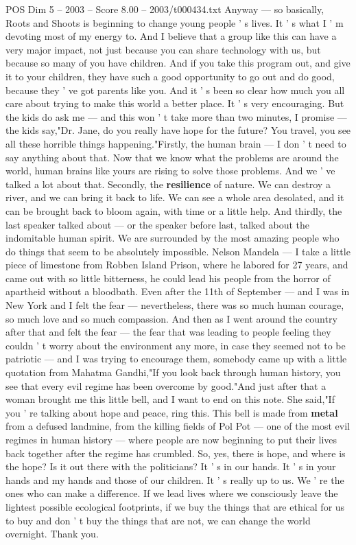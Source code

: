 \begin{textsample}{POS Dim 5 – 2003 – Score 8.00 – 2003/t000434.txt}
Anyway — so basically, Roots and Shoots is beginning to change young people ' s lives.
It ' s what I ' m devoting most of my energy to.
And I believe that a group like this can have a very major impact, not just because you can share technology with us, but because so many of you have children.
And if you take this program out, and give it to your children, they have such a good opportunity to go out and do good, because they ' ve got parents like you.
And it ' s been so clear how much you all care about trying to make this world a better place.
It ' s very encouraging.
But the kids do ask me — and this won ' t take more than two minutes, I promise — the kids say,"Dr.
Jane, do you really have hope for the future?
You travel, you see all these horrible things happening."Firstly, the human brain — I don ' t need to say anything about that.
Now that we know what the problems are around the world, human brains like yours are rising to solve those problems.
And we ' ve talked a lot about that.
Secondly, the \textbf{resilience} of nature.
We can destroy a river, and we can bring it back to life.
We can see a whole area desolated, and it can be brought back to bloom again, with time or a little help.
And thirdly, the last speaker talked about — or the speaker before last, talked about the indomitable human spirit.
We are surrounded by the most amazing people who do things that seem to be absolutely impossible.
Nelson Mandela — I take a little piece of limestone from Robben Island Prison, where he labored for 27 years, and came out with so little bitterness, he could lead his people from the horror of apartheid without a bloodbath.
Even after the 11th of September — and I was in New York and I felt the fear — nevertheless, there was so much human courage, so much love and so much compassion.
And then as I went around the country after that and felt the fear — the fear that was leading to people feeling they couldn ' t worry about the environment any more, in case they seemed not to be patriotic — and I was trying to encourage them, somebody came up with a little quotation from Mahatma Gandhi,"If you look back through human history, you see that every evil regime has been overcome by good."And just after that a woman brought me this little bell, and I want to end on this note.
She said,"If you ' re talking about hope and peace, ring this.
This bell is made from \textbf{metal} from a defused landmine, from the killing fields of Pol Pot — one of the most evil regimes in human history — where people are now beginning to put their lives back together after the regime has crumbled.
So, yes, there is hope, and where is the hope?
Is it out there with the politicians?
It ' s in our hands.
It ' s in your hands and my hands and those of our children.
It ' s really up to us.
We ' re the ones who can make a difference.
If we lead lives where we consciously leave the lightest possible ecological footprints, if we buy the things that are ethical for us to buy and don ' t buy the things that are not, we can change the world overnight.
Thank you.

\end{textsample}
